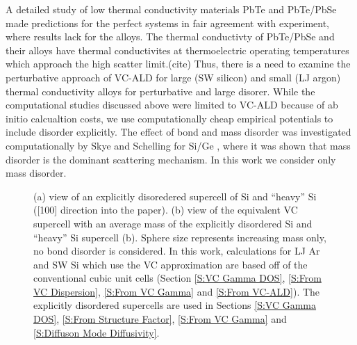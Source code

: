 \documentclass[aps,prb,twocolumn,superscriptaddress,amsmath,amssymb,floatfix]{revtex4}
\begin{document}
A detailed study of low thermal conductivity materials 
PbTe\cite{shiga_microscopic_2012} and PbTe/PbSe\cite{tian_phonon_2012} 
made predictions for the perfect systems in fair agreement with 
experiment, where results lack for the alloys. The thermal conductivty 
of PbTe/PbSe and their alloys have thermal conductivites at thermoelectric 
operating temperatures which approach the high scatter limit.(cite) 
Thus, there is a need to examine the perturbative approach of 
VC-ALD for large (SW silicon) and small (LJ argon) 
thermal conductivity alloys for perturbative and large disorer. 
While the computational studies discussed above were limited to VC-ALD 
because of ab initio calcualtion costs, we use computationally 
cheap empirical potentials to include disorder explicitly. 
The effect of bond and mass disorder was investigated computationally 
by Skye and 
Schelling for Si/Ge \cite{skye_thermal_2008}, 
where it was shown that mass disorder is 
the dominant scattering mechanism. In this work we consider only 
mass disorder.

% 

\begin{figure}
\begin{center}
\mbox{}
\vspace*{0mm}
\end{center}
\caption{\label{F:supercells} 
(a) view of an explicitly disoredered supercell of 
Si and ``heavy'' Si ([100] direction into the paper).
\cite{momma_vesta:_2008} 
(b) view of the equivalent VC supercell 
with an average
mass of the explicitly disordered Si and ``heavy'' Si supercell 
(b). 
Sphere size represents 
increasing mass 
only, no bond disorder is considered. 
In this work, calculations for LJ Ar and SW Si which use the VC 
approximation 
are based off of the conventional cubic unit cells 
(Section \ref{S:VC Gamma DOS}, \ref{S:From VC Dispersion}, 
\ref{S:From VC Gamma} and \ref{S:From VC-ALD}).
The explicitly disordered 
supercells are used in Sections 
\ref{S:VC Gamma DOS}, \ref{S:From Structure Factor},  
\ref{S:From VC Gamma} and \ref{S:Diffuson Mode Diffusivity}. 
}
\end{figure}
\end{document}
